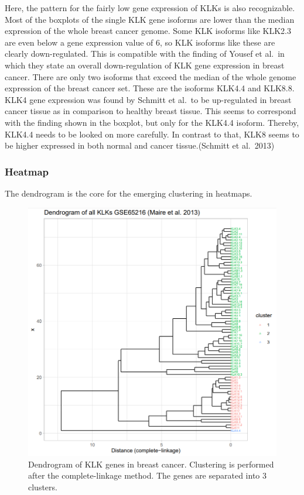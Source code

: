 \documentclass[
]{article}
\begin{document}
Here, the pattern for the fairly low gene expression of KLKs is also
recognizable. Most of the boxplots of the single KLK gene isoforms are
lower than the median expression of the whole breast cancer genome. Some
KLK isoforms like KLK2.3 are even below a gene expression value of 6, so
KLK isoforms like these are clearly down-regulated. This is compatible
with the finding of Yousef et al.~in which they state an overall
down-regulation of KLK gene expression in breast cancer. There are only
two isoforms that exceed the median of the whole genome expression of
the breast cancer set. These are the isoforms KLK4.4 and KLK8.8.\\
KLK4 gene expression was found by Schmitt et al.~to be up-regulated in
breast cancer tissue as in comparison to healthy breast tissue. This
seems to correspond with the finding shown in the boxplot, but only for
the KLK4.4 isoform. Thereby, KLK4.4 needs to be looked on more
carefully. In contrast to that, KLK8 seems to be higher expressed in
both normal and cancer tissue.(Schmitt et al.~2013)

\hypertarget{heatmap}{%
\subsubsection{Heatmap}\label{heatmap}}

The dendrogram is the core for the emerging clustering in heatmaps.

\begin{figure}

{\centering \includegraphics[width=0.5\linewidth]{images/Dendrogram_breast} 

}

\caption{Dendrogram of KLK genes in breast cancer. Clustering is performed after the complete-linkage method. The genes are separated into 3 clusters.}\label{fig:Dendrogram - breast }
\end{figure}
\end{document}
